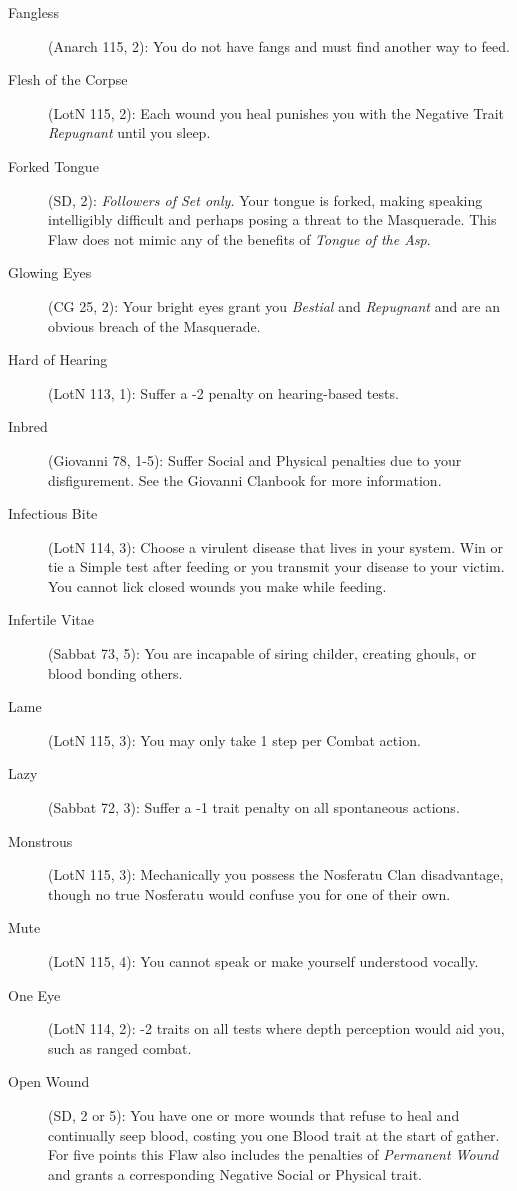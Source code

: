 \begin{description}
	\item[Fangless] (Anarch 115, 2):  You do not have fangs and must find another way to 
	feed.
	\item[Flesh of the Corpse] (LotN 115, 2):  Each wound you heal punishes you with the 
	Negative Trait \emph{Repugnant} until you sleep.
	\item[Forked Tongue] (SD, 2):  \emph{Followers of Set only.}  Your tongue is 
	forked, making speaking intelligibly difficult and perhaps posing a threat to the Masquerade.  
	This Flaw does not mimic any of the benefits of \emph{Tongue of the Asp}.
	\item[Glowing Eyes] (CG 25, 2):  Your bright eyes grant you \emph{Bestial} and 
	\emph{Repugnant} and are an obvious breach of the Masquerade.
	\item[Hard of Hearing] (LotN 113, 1):  Suffer a -2 penalty on hearing-based tests.
	\item[Inbred] (Giovanni 78, 1-5):  Suffer Social and Physical penalties due to your 
	disfigurement.  See the Giovanni Clanbook for more information.
	\item[Infectious Bite] (LotN 114, 3):  Choose a virulent disease that lives in your system. 
	Win or tie a Simple test after feeding or you transmit your disease to your victim. You 
	cannot lick closed wounds you make while feeding.
	\item[Infertile Vitae] (Sabbat 73, 5):  You are incapable of siring childer, creating 
	ghouls, or blood bonding others.
	\item[Lame] (LotN 115, 3):  You may only take 1 step per Combat action.
	\item[Lazy] (Sabbat 72, 3):  Suffer a -1 trait penalty on all spontaneous actions.
	\item[Monstrous] (LotN 115, 3):  Mechanically you possess the Nosferatu Clan disadvantage, 
	though no true Nosferatu would confuse you for one of their own.
	\item[Mute] (LotN 115, 4):  You cannot speak or make yourself understood vocally.
	\item[One Eye] (LotN 114, 2):  -2 traits on all tests where depth perception would 
	aid you, such as ranged combat.
	\item[Open Wound] (SD, 2 or 5):  You have one or more wounds that refuse to 
	heal and continually seep blood, costing you one Blood trait at the start of gather.  For 
	five points this Flaw also includes the penalties of \emph{Permanent Wound} and grants a 
	corresponding Negative Social or Physical trait.

\end{description}
